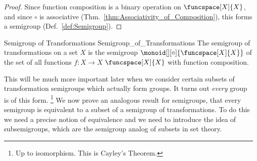         \begin{proof}
            Since function composition is a binary operation on
            $\funcspace[X]{X}$, and since $\circ$ is associative
            (Thm.~\ref{thm:Associativity_of_Composition}), this forms a
            semigroup (Def.~\ref{def:Semigroup}).
        \end{proof}
        \begin{fdefinition}{Semigroup of Transformations}
                           {Semigroup_of_Transformations}
            The semigroup of transformations on a set $X$ is the semigroup
            $\monoid[][\circ]{\funcspace[X]{X}}$ of the set of all functions
            $f:X\rightarrow{X}$ $\funcspace[X]{X}$ with function composition.
        \end{fdefinition}
        This will be much more important later when we consider certain subsets
        of transformation semigroups which actually form groups. It turns out
        \textit{every} group is of this form.%
        \footnote{%
            Up to isomorphism. This is Cayley's Theorem.%
        }
        We now prove an analogous result for semigroups, that every semigroup is
        equivalent to a subset of a semigroup of transformations. To do this we
        need a precise notion of equivalence and we need to introduce the idea
        of subsemigroups, which are the semigroup analog of subsets in set
        theory.
